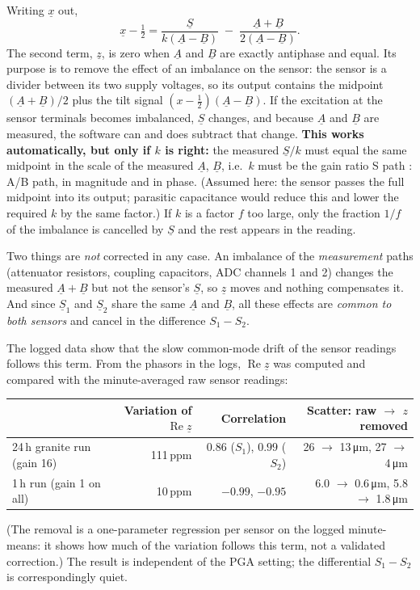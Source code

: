 \documentclass[11pt,a4paper]{article}
\begin{document}
Writing $\underline{x}$ out,
\begin{equation}
  \underline{x}-\tfrac12
  = \frac{\underline{S}}{k(\underline{A}-\underline{B})}
    \;-\; \frac{\underline{A}+\underline{B}}{2(\underline{A}-\underline{B})} .
\end{equation}
The second term, $\underline{z}$, is zero when $\underline{A}$ and
$\underline{B}$ are exactly antiphase and equal.  Its purpose is to remove
the effect of an imbalance on the sensor: the sensor is a divider between
its two supply voltages, so its output contains the midpoint
$(\underline{A}+\underline{B})/2$ plus the tilt signal
$(x-\tfrac12)(\underline{A}-\underline{B})$.  If the excitation at the
sensor terminals becomes imbalanced, $\underline{S}$ changes, and because
$\underline{A}$ and $\underline{B}$ are measured, the software can and does
subtract that change.  \textbf{This works automatically, but only if $k$ is
right:} the measured $\underline{S}/k$ must equal the same midpoint in the
scale of the measured $\underline{A}$, $\underline{B}$, i.e.\ $k$ must be the
gain ratio S path : A/B path, in magnitude and in phase.  (Assumed here: the
sensor passes the full midpoint into its output; parasitic capacitance would
reduce this and lower the required $k$ by the same factor.)  If $k$ is a
factor $f$ too large, only the fraction $1/f$ of the imbalance is cancelled by
$\underline{S}$ and the rest appears in the reading.

Two things are \emph{not} corrected in any case.  An imbalance of the
\emph{measurement} paths (attenuator resistors, coupling capacitors, ADC
channels 1 and 2) changes the measured $\underline{A}+\underline{B}$ but not
the sensor's $\underline{S}$, so $\underline{z}$ moves and nothing
compensates it.  And since $\underline{S}_1$ and $\underline{S}_2$ share the
same $\underline{A}$ and $\underline{B}$, all these effects are \emph{common
to both sensors} and cancel in the difference $S_1-S_2$.

The logged data show that the slow common-mode drift of the sensor readings
follows this term.  From the phasors in the logs,
$\operatorname{Re}\underline{z}$ was computed and compared with the
minute-averaged raw sensor readings:
\begin{center}
\small
\begin{tabular}{@{}lrrr@{}}
\toprule
 & Variation of $\operatorname{Re}\underline{z}$ & Correlation & Scatter: raw $\to$ $z$ removed \\
\midrule
24\,h granite run (gain 16)      & 111\,ppm & $0.86$ ($S_1$), $0.99$ ($S_2$)
     & 26 $\to$ 13\,\si{\micro\metre}, 27 $\to$ 4\,\si{\micro\metre} \\
1\,h run (gain 1 on all)         & 10\,ppm  & $-0.99$, $-0.95$
     & 6.0 $\to$ 0.6\,\si{\micro\metre}, 5.8 $\to$ 1.8\,\si{\micro\metre} \\
\bottomrule
\end{tabular}
\end{center}
(The removal is a one-parameter regression per sensor on the logged
minute-means: it shows how much of the variation follows this term, not a
validated correction.)  The result is independent of the PGA setting; the
differential $S_1-S_2$ is correspondingly quiet.
\end{document}
